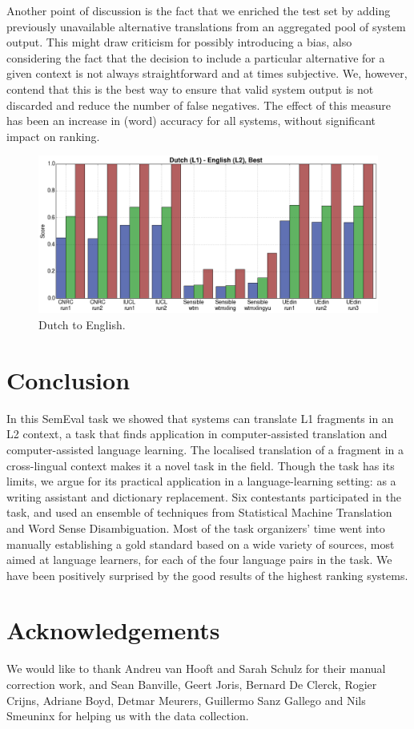 Another point of discussion is the fact that we enriched the test set by adding
previously unavailable alternative translations from an aggregated pool of
system output. This might draw criticism for possibly introducing a bias, also
considering the fact that the decision to include a particular alternative for
a given context is not always straightforward and at times subjective. We,
however, contend that this is the best way to ensure that valid system output
is not discarded and reduce the number of false negatives. The effect of this
measure has been an increase in (word) accuracy for all systems, without
significant impact on ranking.


\begin{figure}[bth] %
\includegraphics[width=16cm]{nl-en-best-2.png}
\caption{Dutch to English.}
\label{fig:graphs2}
\end{figure}

\section{Conclusion}

In this SemEval task we showed that systems can translate L1 fragments in an L2
context, a task that finds application in computer-assisted translation and
computer-assisted language learning. The localised translation of a fragment in
a cross-lingual context makes it a novel task in the field. Though the task has
its limits, we argue for its practical application in a language-learning
setting: as a writing assistant and dictionary replacement. Six contestants
participated in the task, and used an ensemble of techniques from Statistical
Machine Translation and Word Sense Disambiguation. Most of the task organizers'
time went into manually establishing a gold standard based on a wide variety of
sources, most aimed at language learners, for each of the four language pairs
in the task. We have been positively surprised by the good results of the
highest ranking systems.

\section{Acknowledgements}

We would like to thank Andreu van Hooft and Sarah Schulz for their manual
correction work, and Sean Banville, Geert Joris, Bernard De Clerck, Rogier
Crijns, Adriane Boyd, Detmar Meurers, Guillermo Sanz Gallego and Nils Smeuninx
for helping us with the data collection.
